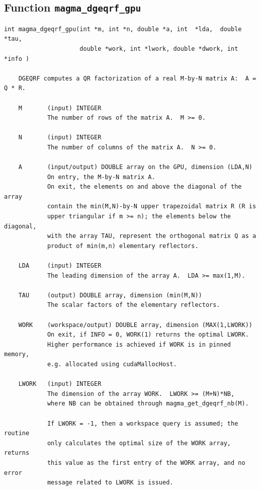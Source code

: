 \documentclass[10pt]{book}
\begin{document}
\newpage
\subsection{Function {\tt {\bf magma\_dgeqrf\_gpu}}}
\begin{verbatim}
int magma_dgeqrf_gpu(int *m, int *n, double *a, int  *lda,  double  *tau,
                     double *work, int *lwork, double *dwork, int *info )
   
    DGEQRF computes a QR factorization of a real M-by-N matrix A:  A = Q * R.   

    M       (input) INTEGER   
            The number of rows of the matrix A.  M >= 0.   

    N       (input) INTEGER   
            The number of columns of the matrix A.  N >= 0.   

    A       (input/output) DOUBLE array on the GPU, dimension (LDA,N)   
            On entry, the M-by-N matrix A.   
            On exit, the elements on and above the diagonal of the array   
            contain the min(M,N)-by-N upper trapezoidal matrix R (R is   
            upper triangular if m >= n); the elements below the diagonal,   
            with the array TAU, represent the orthogonal matrix Q as a   
            product of min(m,n) elementary reflectors.

    LDA     (input) INTEGER   
            The leading dimension of the array A.  LDA >= max(1,M).   

    TAU     (output) DOUBLE array, dimension (min(M,N))   
            The scalar factors of the elementary reflectors.   

    WORK    (workspace/output) DOUBLE array, dimension (MAX(1,LWORK))   
            On exit, if INFO = 0, WORK(1) returns the optimal LWORK.   
            Higher performance is achieved if WORK is in pinned memory, 
            e.g. allocated using cudaMallocHost.

    LWORK   (input) INTEGER   
            The dimension of the array WORK.  LWORK >= (M+N)*NB,   
            where NB can be obtained through magma_get_dgeqrf_nb(M).

            If LWORK = -1, then a workspace query is assumed; the routine   
            only calculates the optimal size of the WORK array, returns   
            this value as the first entry of the WORK array, and no error   
            message related to LWORK is issued.   


\end{verbatim}
\end{document}
